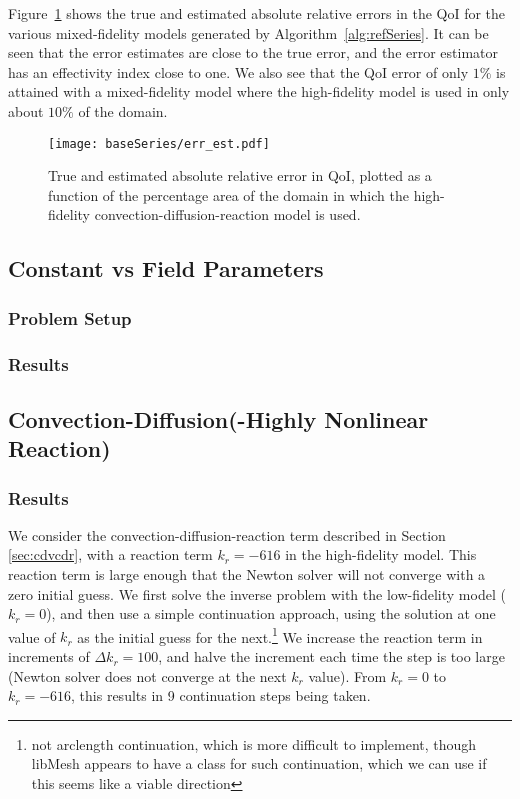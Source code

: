 Figure~\ref{fig:baseErr} shows the true and estimated absolute relative errors in the QoI for the various mixed-fidelity models generated by Algorithm~\ref{alg:refSeries}. It can be seen that the error estimates are close to the true error, and the error estimator has an effectivity index close to one. We also see that the QoI error of only $1\%$ is attained with a mixed-fidelity model where the high-fidelity model is used in only about $10\%$ of the domain.
%
\begin{figure}[h]
\centering
\texttt{[image: baseSeries/err\_est.pdf]}
\caption{True and estimated absolute relative error in QoI, plotted as a function of the percentage area of the domain in which the high-fidelity convection-diffusion-reaction model is used.}
\label{fig:baseErr}
\end{figure}
%
\subsection{Constant vs Field Parameters}
%
\subsubsection{Problem Setup}
%
\subsubsection{Results}
%
\subsection{Convection-Diffusion(-Highly Nonlinear Reaction)}
%
\subsubsection{Results}
%
We consider the convection-diffusion-reaction term described in Section \ref{sec:cdvcdr}, with a reaction term $k_r=-616$ in the high-fidelity model. This reaction term is large enough that the Newton solver will not converge with a zero initial guess. We first solve the inverse problem with the low-fidelity model ($k_r=0$), and then use a simple continuation approach, using the solution at one value of $k_r$ as the initial guess for the next.\footnote{not arclength continuation, which is more difficult to implement, though libMesh appears to have a class for such continuation, which we can use if this seems like a viable direction} We increase the reaction term in increments of $\Delta k_r=100$, and halve the increment each time the step is too large (Newton solver does not converge at the next $k_r$ value). From $k_r=0$ to $k_r=-616$, this results in 9 continuation steps being taken.
%
